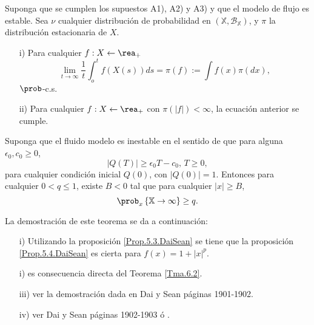 \begin{Teo}\label{Tma.6.4.DaiSean}
Suponga que se cumplen los supuestos A1), A2) y A3) y que el
modelo de flujo es estable. Sea $\nu$ cualquier distribuci\'on de
probabilidad en
$\left(\mathbb{X},\mathcal{B}_{\mathbb{X}}\right)$, y $\pi$ la
distribuci\'on estacionaria de $X$.
\begin{itemize}
\item[i)] Para cualquier $f:X\leftarrow\rea_{+}$
\begin{equation}
\lim_{t\rightarrow\infty}\frac{1}{t}\int_{o}^{t}f\left(X\left(s\right)\right)ds=\pi\left(f\right):=\int
f\left(x\right)\pi\left(dx\right),
\end{equation}
$\prob$-c.s.

\item[ii)] Para cualquier $f:X\leftarrow\rea_{+}$ con
$\pi\left(|f|\right)<\infty$, la ecuaci\'on anterior se cumple.
\end{itemize}
\end{Teo}

\begin{Teo}\label{Tma2.2.Down}
Suponga que el fluido modelo es inestable en el sentido de que
para alguna $\epsilon_{0},c_{0}\geq0$,
\begin{equation}\label{Eq.Inestability}
|Q\left(T\right)|\geq\epsilon_{0}T-c_{0}\textrm{,   }T\geq0,
\end{equation}
para cualquier condici\'on inicial $Q\left(0\right)$, con
$|Q\left(0\right)|=1$. Entonces para cualquier $0<q\leq1$, existe
$B<0$ tal que para cualquier $|x|\geq B$,
\begin{equation}
\prob_{x}\left\{\mathbb{X}\rightarrow\infty\right\}\geq q.
\end{equation}
\end{Teo}

\begin{Dem} La demostraci\'on de este
teorema se da a continuaci\'on:\\
\begin{itemize}
\item[i)] Utilizando la proposici\'on \ref{Prop.5.3.DaiSean} se
tiene que la proposici\'on \ref{Prop.5.4.DaiSean} es cierta para
$f\left(x\right)=1+|x|^{p}$.

\item[i)] es consecuencia directa del Teorema \ref{Tma.6.2}.

\item[iii)] ver la demostraci\'on dada en Dai y Sean
\cite{DaiSean} p\'aginas 1901-1902.

\item[iv)] ver Dai y Sean \cite{DaiSean} p\'aginas 1902-1903 \'o
\cite{MeynTweedie2}.
\end{itemize}
\end{Dem}


